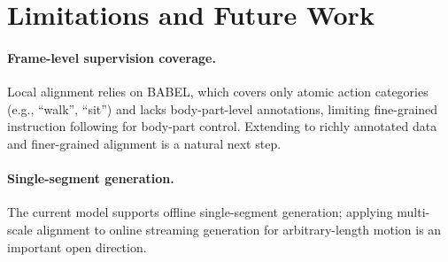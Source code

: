 \documentclass{article}
\begin{document}



\section{Limitations and Future Work}
\label{app:limitations}

\paragraph{Frame-level supervision coverage.}
Local alignment relies on BABEL, which covers only atomic action categories (e.g., ``walk'', ``sit'') and lacks body-part-level annotations, limiting fine-grained instruction following for body-part control. Extending to richly annotated data and finer-grained alignment is a natural next step.

\paragraph{Single-segment generation.}
The current model supports offline single-segment generation; applying multi-scale alignment to online streaming generation for arbitrary-length motion is an important open direction.

\newpage

\end{document}
